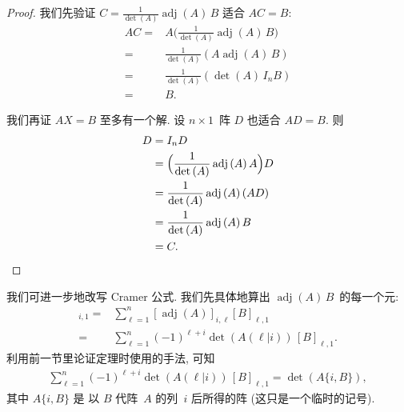\documentclass[%
    UTF8,%
    fontset=none,%
    punct=kaiming,%
    zihao=-4,%
    a4paper,%
    oneside,%
]{ctexbook}
\begin{document}
\begin{proof}
    我们先验证
    \(C = \frac{1}{\det {(A)}} \operatorname{adj} {(A)}\,B\)
    适合 \(AC = B\):
    \begin{align*}
        AC
        = {} & A\Big( \frac{1}{\det {(A)}}
        \operatorname{adj} {(A)}\,B \Big)
        \\
        = {} & \frac{1}{\det {(A)}} (A\operatorname{adj} {(A)}\,B)
        \\
        = {} & \frac{1}{\det {(A)}} (\det {(A)}\,I_n B)
        \\
        = {} & B.
    \end{align*}

    我们再证 \(AX = B\) 至多有一个解.
    设 \(n \times 1\)~阵 \(D\) 也适合 \(AD = B\).
    则
    \begin{align*}
        D
        = {} & I_n D
        \\
        = {} & \Big( \frac{1}{\det {(A)}}
        \operatorname{adj} {(A)}\,A \Big) D
        \\
        = {} & \frac{1}{\det {(A)}}
        \operatorname{adj} {(A)}\, (AD)
        \\
        = {} & \frac{1}{\det {(A)}}
        \operatorname{adj} {(A)}\,B
        \\
        = {} & C.
        \qedhere
    \end{align*}
\end{proof}

我们可进一步地改写 Cramer 公式.
我们先具体地算出
\(\operatorname{adj} {(A)}\,B\)~的每一个元:
\begin{align*}
    [\operatorname{adj} {(A)}\,B]_{i,1}
    = {} &
    \sum_{\ell = 1}^{n}
    {[\operatorname{adj} {(A)}]_{i,\ell} [B]_{\ell,1}}
    \\
    = {} &
    \sum_{\ell = 1}^{n}
    {(-1)^{\ell+i} \det {(A(\ell|i))}\, [B]_{\ell,1}}.
\end{align*}
利用前一节里论证定理时使用的手法, 可知
\begin{align*}
    \sum_{\ell = 1}^{n}
    {(-1)^{\ell+i} \det {(A(\ell|i))}\, [B]_{\ell,1}}
    =
    \det {(A \{i, B\})},
\end{align*}
其中 \(A \{i, B\}\) 是%
以 \(B\) 代阵~\(A\) 的列~\(i\) 后所得的阵
(这只是一个临时的记号).
\end{document}
